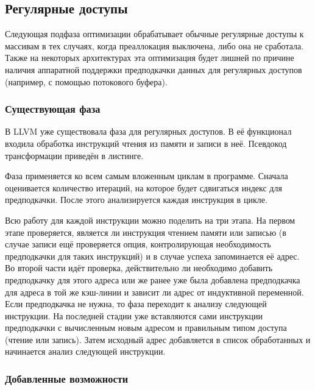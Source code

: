 \documentclass[12pt,a4paper]{article}
\begin{document}
\subsection{Регулярные доступы}

\indent

Следующая подфаза оптимизации обрабатывает обычные регулярные доступы к массивам в тех случаях, когда преаллокация выключена, либо она не сработала. Также на некоторых архитектурах эта оптимизация будет лишней по причине наличия аппаратной поддержки предподкачки данных для регулярных доступов (например, с помощью потокового буфера).

\subsubsection{Существующая фаза}

\indent

В LLVM уже существовала фаза для регулярных доступов. В её функционал входила обработка инструкций чтения из памяти и записи в неё. Псевдокод трансформации приведён в листинге.



Фаза применяется ко всем самым вложенным циклам в программе. Сначала оценивается количество итераций, на которое будет сдвигаться индекс для предподкачки. После этого анализируется каждая инструкция в цикле.

Всю работу для каждой инструкции можно поделить на три этапа. На первом этапе проверяется, является ли инструкция чтением памяти или записью (в случае записи ещё проверяется опция, контролирующая необходимость предподкачки для таких инструкций) и в случае успеха запоминается её адрес. Во второй части идёт проверка, действительно ли необходимо добавить предподкачку для этого адреса или же ранее уже была добавлена предподкачка для адреса в той же кэш-линии и зависит ли адрес от индуктивной переменной. Если предподкачка не нужна, то фаза переходит к анализу следующей инструкции. На последней стадии уже вставляются сами инструкции предподкачки с вычисленным новым адресом и правильным типом доступа (чтение или запись). Затем исходный адрес добавляется в список обработанных и начинается анализ следующей инструкции.

\subsubsection{Добавленные возможности}
\end{document}
